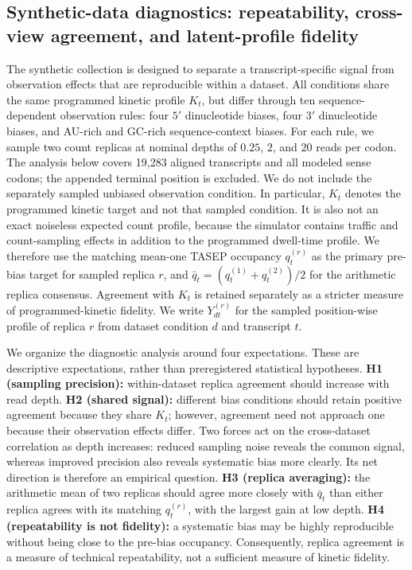\providecommand{\syntheticdatafigdir}{figures/synthetic_appendix}

\subsection{Synthetic-data diagnostics: repeatability, cross-view agreement,
and latent-profile fidelity}
\label{sec:synthetic_data_diagnostics}

The synthetic collection is designed to separate a transcript-specific signal
from observation effects that are reproducible within a dataset.  All
conditions share the same programmed kinetic profile $K_t$, but differ through
ten sequence-dependent observation rules: four $5'$ dinucleotide biases, four
$3'$ dinucleotide biases, and AU-rich and GC-rich sequence-context biases.  For
each rule, we sample two count replicas at nominal depths of $0.25$, $2$, and
$20$ reads per codon.  The analysis below covers 19,283 aligned transcripts and
all modeled sense codons; the appended terminal position is excluded.  We do
not include the separately sampled unbiased observation condition.  In
particular, $K_t$ denotes the programmed kinetic target and not that sampled
condition.  It is also not an exact noiseless expected count profile, because
the simulator contains traffic and count-sampling effects in addition to the
programmed dwell-time profile.  We therefore use the matching mean-one TASEP
occupancy $q_t^{(r)}$ as the primary pre-bias target for sampled replica $r$,
and $\bar q_t=(q_t^{(1)}+q_t^{(2)})/2$ for the arithmetic replica consensus.
Agreement with $K_t$ is retained separately as a stricter measure of
programmed-kinetic fidelity.  We write $Y^{(r)}_{dt}$ for the sampled
position-wise profile of replica $r$ from dataset condition $d$ and transcript
$t$.

We organize the diagnostic analysis around four expectations.  These are
descriptive expectations, rather than preregistered statistical hypotheses.
\textbf{H1 (sampling precision):} within-dataset replica agreement should
increase with read depth.  \textbf{H2 (shared signal):} different bias
conditions should retain positive agreement because they share $K_t$; however,
agreement need not approach one because their observation effects differ.
Two forces act on the cross-dataset correlation as depth increases: reduced
sampling noise reveals the common signal, whereas improved precision also
reveals systematic bias more clearly.  Its net direction is therefore an
empirical question.  \textbf{H3 (replica averaging):} the arithmetic mean of
two replicas should agree more closely with $\bar q_t$ than either replica
agrees with its matching $q_t^{(r)}$, with the largest gain at low depth.
\textbf{H4 (repeatability is not
fidelity):} a systematic bias may be highly reproducible without being close
to the pre-bias occupancy.  Consequently, replica agreement is a measure of technical
repeatability, not a sufficient measure of kinetic fidelity.

